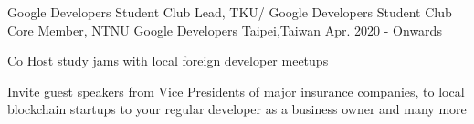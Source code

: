 \begin{cventries}
{\begin{cvitems}
      \end{cvitems}
    }
  \cventry
    {Google Developers Student Club Lead, TKU/ Google Developers Student Club Core Member, NTNU} %
    {\newline Google Developers} %
    {Taipei,Taiwan} %
    {Apr. 2020 - Onwards} %
    {
      \begin{cvitems} %
        \item {Co Host study jams with local foreign developer meetups}
        \item {Invite guest speakers from Vice Presidents of major insurance companies, to local blockchain startups to your regular developer as a business owner and many more}
      \end{cvitems}
    }


\end{cventries}
